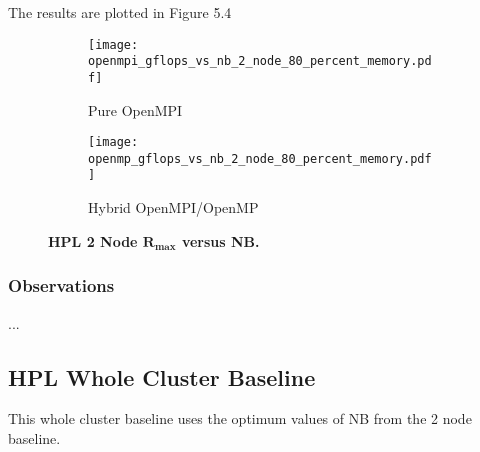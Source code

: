 The results are plotted in Figure 5.4

\begin{figure}[H]
	\begin{subfigure}{1.0\textwidth}
		\centering
		\texttt{[image: openmpi\_gflops\_vs\_nb\_2\_node\_80\_percent\_memory.pdf]}
		\caption{Pure OpenMPI}
		\label{fig:subim1}
	\end{subfigure}
	\par\bigskip
	\begin{subfigure}{1.0\textwidth}
		\centering
		\texttt{[image: openmp\_gflops\_vs\_nb\_2\_node\_80\_percent\_memory.pdf]}
		\caption{Hybrid OpenMPI/OpenMP}
		\label{fig:subim2}
	\end{subfigure}
\caption{\textbf{HPL 2 Node $\mathbf{R_{max}}$ versus NB.}}
\label{fig:image2}
\end{figure}

%
%
\subsubsection{Observations}

...


%
%
\subsection{HPL Whole Cluster Baseline}

This whole cluster baseline uses the optimum values of NB from the 2 node baseline.

